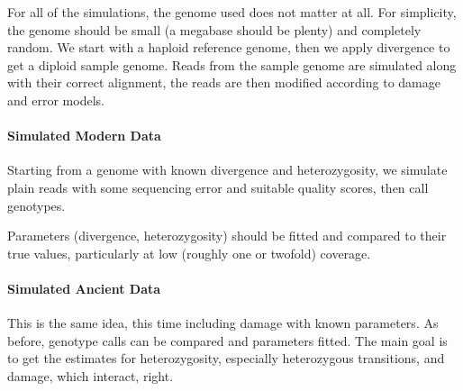 \documentclass{article}
\begin{document}
For all of the simulations, the genome used does not matter at all.  For
simplicity, the genome should be small (a megabase should be plenty) and
completely random.  We start with a haploid reference genome, then we
apply divergence to get a diploid sample genome.  Reads from the sample
genome are simulated along with their correct alignment, the reads are
then modified according to damage and error models.




\paragraph{Simulated Modern Data}

Starting from a genome with known divergence and heterozygosity, we
simulate plain reads with some sequencing error and suitable quality
scores, then call genotypes.

Parameters (divergence, heterozygosity) should be fitted and compared to
their true values, particularly at low (roughly one or twofold)
coverage.



\paragraph{Simulated Ancient Data}

This is the same idea, this time including damage with known parameters.
As before, genotype calls can be compared and parameters fitted.  The
main goal is to get the estimates for heterozygosity, especially
heterozygous transitions, and damage, which interact, right.
\end{document}
